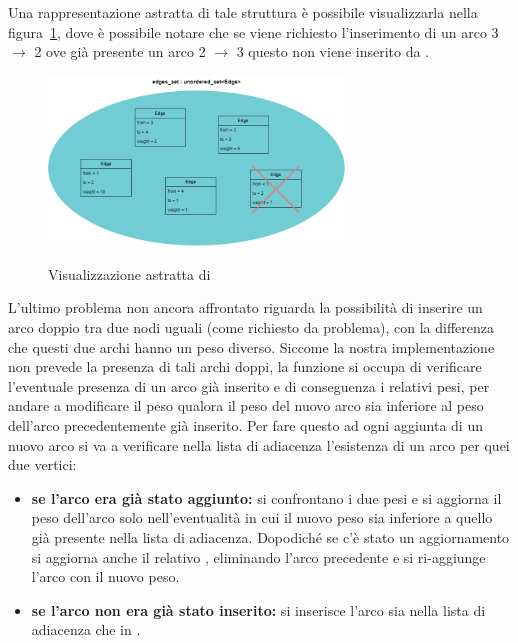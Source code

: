 Una rappresentazione astratta di tale struttura è possibile visualizzarla nella figura~\ref{fig:edges_set}, dove è possibile notare che se viene richiesto l'inserimento di un arco 3 $\rightarrow$ 2 ove già presente un arco 2 $\rightarrow$ 3 questo non viene inserito da .\\

\begin{figure}[h]
	\caption{Visualizzazione astratta di }
	\centering
	\includegraphics[width=0.7\textwidth]{./images/edges_setAbstract.png}
	\label{fig:edges_set}
\end{figure}

L'ultimo problema non ancora affrontato riguarda la possibilità di inserire un arco doppio tra due nodi uguali (come richiesto da problema), con la differenza che questi due archi hanno un peso diverso. Siccome la nostra implementazione non prevede la presenza di tali archi doppi, la funzione  si occupa di verificare l'eventuale presenza di un arco già inserito e di conseguenza i relativi pesi, per andare a modificare il peso qualora il peso del nuovo arco sia inferiore al peso dell'arco precedentemente già inserito. Per fare questo ad ogni aggiunta di un nuovo arco si va a verificare nella lista di adiacenza l'esistenza di un arco per quei due vertici:
\begin{itemize}
	\item \textbf{se l'arco era già stato aggiunto:} si confrontano i due pesi e si aggiorna il peso dell'arco solo nell'eventualità in cui il nuovo peso sia inferiore a quello già presente nella lista di adiacenza. Dopodiché se c'è stato un aggiornamento si aggiorna anche il relativo , eliminando l'arco precedente e si ri-aggiunge l'arco con il nuovo peso. 
	\item \textbf{se l'arco non era già stato inserito:} si inserisce l'arco sia nella lista di adiacenza che in .
\end{itemize}

